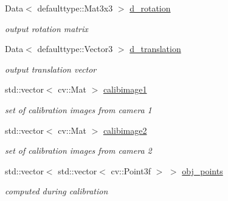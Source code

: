 \begin{DoxyCompactItemize}
Data$<$ defaulttype\+::\+Mat3x3 $>$ \hyperlink{classsofa_1_1rgbdtracking_1_1_multi_cam_calibrator_a28a099352b2407922e6a1d06e8e6d67c}{d\+\_\+rotation}
\begin{DoxyCompactList}\small\item\em output rotation matrix \end{DoxyCompactList}\item 
\mbox{\label{classsofa_1_1rgbdtracking_1_1_multi_cam_calibrator_adeaf7f08d528ed949f2d45593c0c9000}} 
Data$<$ defaulttype\+::\+Vector3 $>$ \hyperlink{classsofa_1_1rgbdtracking_1_1_multi_cam_calibrator_adeaf7f08d528ed949f2d45593c0c9000}{d\+\_\+translation}
\begin{DoxyCompactList}\small\item\em output translation vector \end{DoxyCompactList}\item 
\mbox{\label{classsofa_1_1rgbdtracking_1_1_multi_cam_calibrator_aca06611c99ba2fb969cb88e04e0c7e07}} 
std\+::vector$<$ cv\+::\+Mat $>$ \hyperlink{classsofa_1_1rgbdtracking_1_1_multi_cam_calibrator_aca06611c99ba2fb969cb88e04e0c7e07}{calibimage1}
\begin{DoxyCompactList}\small\item\em set of calibration images from camera 1 \end{DoxyCompactList}\item 
\mbox{\label{classsofa_1_1rgbdtracking_1_1_multi_cam_calibrator_a5b8c9fb0835eec99c954c9a85698555b}} 
std\+::vector$<$ cv\+::\+Mat $>$ \hyperlink{classsofa_1_1rgbdtracking_1_1_multi_cam_calibrator_a5b8c9fb0835eec99c954c9a85698555b}{calibimage2}
\begin{DoxyCompactList}\small\item\em set of calibration images from camera 2 \end{DoxyCompactList}\item 
\mbox{\label{classsofa_1_1rgbdtracking_1_1_multi_cam_calibrator_a965bea101a949a3ed561530939987da1}} 
std\+::vector$<$ std\+::vector$<$ cv\+::\+Point3f $>$ $>$ \hyperlink{classsofa_1_1rgbdtracking_1_1_multi_cam_calibrator_a965bea101a949a3ed561530939987da1}{obj\+\_\+points}
\begin{DoxyCompactList}\small\item\em computed during calibration \end{DoxyCompactList}\item 

\end{DoxyCompactItemize}
